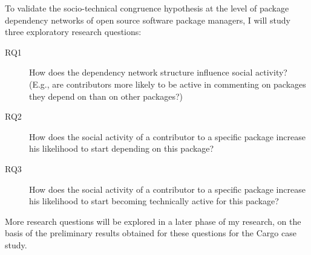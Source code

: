 To validate the socio-technical congruence hypothesis at the level of package dependency networks of open source software package managers, I will study three exploratory research questions: 
\begin{description}
\item[RQ1] How does the dependency network structure influence social activity? (E.g., are contributors more likely to be active in commenting on packages they depend on than on other packages?)
\item[RQ2] How does the social activity of a contributor to a specific package increase his likelihood to start depending on this package?
\item[RQ3] How does the social activity of a contributor to a specific package increase his likelihood to start becoming technically active for this package?
\end{description}

More research questions will be explored in a later phase of my research, on the basis of the preliminary results obtained for these questions for the Cargo case study. 